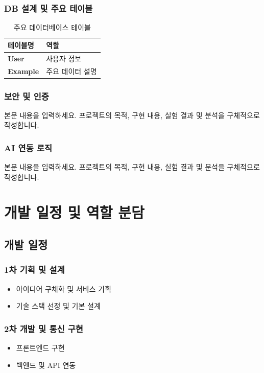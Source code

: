 \documentclass[12pt,a4paper,oneside]{report}
\newcommand{\placeholdertext}{%
  본문 내용을 입력하세요. 프로젝트의 목적, 구현 내용, 실험 결과 및 분석을 구체적으로 작성합니다.
}
\begin{document}
\subsection{DB 설계 및 주요 테이블}
\begin{table}[H]
  \centering
  \begin{tabularx}{0.92\textwidth}{>{\bfseries}l X}
    \toprule
    테이블명 & 역할 \\
    \midrule
    User & 사용자 정보 \\
    Example & 주요 데이터 설명 \\
    \bottomrule
  \end{tabularx}
  \caption{주요 데이터베이스 테이블}
\end{table}

\subsection{보안 및 인증}
\placeholdertext

\subsection{AI 연동 로직}
\placeholdertext

\chapter{개발 일정 및 역할 분담}

\section{개발 일정}

\subsection{1차 기획 및 설계}
\begin{itemize}[leftmargin=1.5em,label={-},itemsep=2pt,topsep=4pt]
  \item 아이디어 구체화 및 서비스 기획
  \item 기술 스택 선정 및 기본 설계
\end{itemize}

\subsection{2차 개발 및 통신 구현}
\begin{itemize}[leftmargin=1.5em,label={-},itemsep=2pt,topsep=4pt]
  \item 프론트엔드 구현
  \item 백엔드 및 API 연동
\end{itemize}
\end{document}
